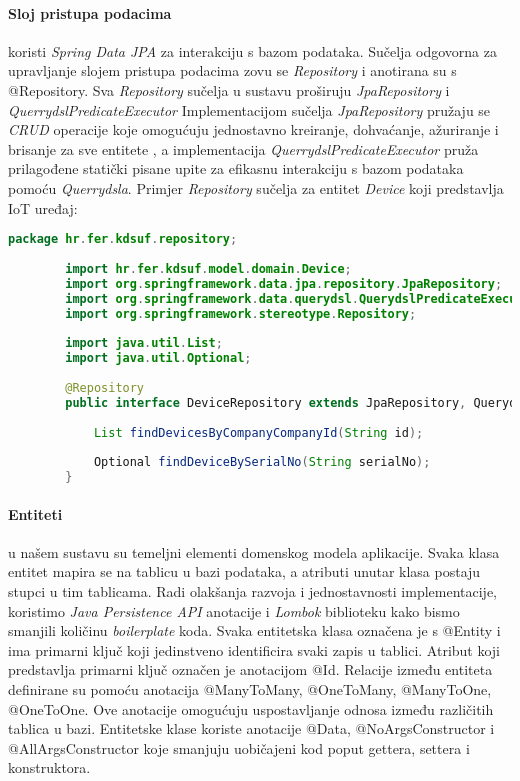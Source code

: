 \documentclass[zavrsnirad]{fer}
\begin{document}
	\paragraph{Sloj pristupa podacima} koristi \textit{Spring Data JPA} za interakciju s bazom podataka. Sučelja odgovorna za upravljanje slojem pristupa podacima zovu se  \textit{Repository}  i anotirana su s @Repository. Sva \textit{Repository} sučelja u sustavu proširuju \textit{JpaRepository} i \textit{QuerrydslPredicateExecutor} Implementacijom sučelja \textit{JpaRepository} pružaju se \textit{CRUD} operacije koje omogućuju jednostavno kreiranje, dohvaćanje, ažuriranje i brisanje za sve entitete , a implementacija \textit{QuerrydslPredicateExecutor} pruža prilagođene statički pisane upite za efikasnu interakciju s bazom podataka pomoću \textit{Querrydsla}. Primjer \textit{Repository} sučelja za entitet \textit{Device} koji predstavlja IoT uređaj: 
	\begin{lstlisting}[language=Java, caption=Device Repository]
		package hr.fer.kdsuf.repository;
		
		import hr.fer.kdsuf.model.domain.Device;
		import org.springframework.data.jpa.repository.JpaRepository;
		import org.springframework.data.querydsl.QuerydslPredicateExecutor;
		import org.springframework.stereotype.Repository;
		
		import java.util.List;
		import java.util.Optional;
		
		@Repository
		public interface DeviceRepository extends JpaRepository, QuerydslPredicateExecutor {
			
			List findDevicesByCompanyCompanyId(String id);
			
			Optional findDeviceBySerialNo(String serialNo);
		}
	\end{lstlisting}
	
	\paragraph{Entiteti} u našem sustavu su temeljni elementi domenskog modela aplikacije. Svaka klasa entitet mapira se na tablicu u bazi podataka, a atributi unutar klasa postaju stupci u tim tablicama. 
	Radi olakšanja razvoja i jednostavnosti implementacije, koristimo \textit{Java Persistence API} anotacije i \textit{Lombok} biblioteku kako bismo smanjili količinu \textit{boilerplate} koda. Svaka entitetska klasa označena je s @Entity i ima primarni ključ koji jedinstveno identificira svaki zapis u tablici. Atribut koji predstavlja primarni ključ označen je anotacijom @Id. Relacije između entiteta definirane su pomoću anotacija @ManyToMany, @OneToMany, @ManyToOne, @OneToOne. Ove anotacije omogućuju uspostavljanje odnosa između različitih tablica u bazi. Entitetske klase koriste anotacije @Data, @NoArgsConstructor i @AllArgsConstructor koje smanjuju uobičajeni kod poput gettera, settera i konstruktora.
	
\end{document}
